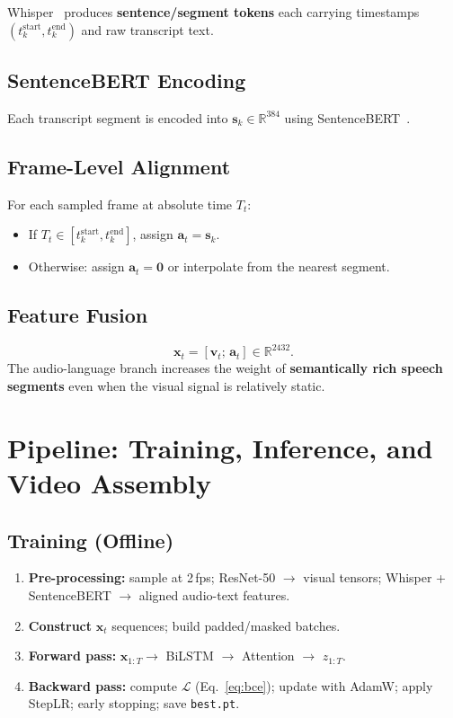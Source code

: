 \documentclass[10pt,conference]{IEEEtran}
\begin{document}
Whisper~\cite{radford2023whisper} produces \textbf{sentence/segment tokens}
each carrying timestamps $(t_k^{\mathrm{start}}, t_k^{\mathrm{end}})$ and raw
transcript text.

\subsection{SentenceBERT Encoding}

Each transcript segment is encoded into
$\mathbf{s}_k \in \mathbb{R}^{384}$ using SentenceBERT~\cite{reimers2019}.

\subsection{Frame-Level Alignment}

For each sampled frame at absolute time $T_t$:
\begin{itemize}
  \item If $T_t \in [t_k^{\mathrm{start}}, t_k^{\mathrm{end}}]$, assign
        $\mathbf{a}_t = \mathbf{s}_k$.
  \item Otherwise: assign $\mathbf{a}_t = \mathbf{0}$ or interpolate from
        the nearest segment.
\end{itemize}

\subsection{Feature Fusion}

\begin{equation}
  \mathbf{x}_t = [\mathbf{v}_t;\, \mathbf{a}_t] \in \mathbb{R}^{2432}.
\end{equation}
The audio-language branch increases the weight of \textbf{semantically rich
speech segments} even when the visual signal is relatively static.

\section{Pipeline: Training, Inference, and Video Assembly}

\subsection{Training (Offline)}

\begin{enumerate}
  \item \textbf{Pre-processing:} sample at 2\,fps; ResNet-50 $\to$ visual
        tensors; Whisper + SentenceBERT $\to$ aligned audio-text features.
  \item \textbf{Construct} $\mathbf{x}_t$ sequences; build padded/masked
        batches.
  \item \textbf{Forward pass:} $\mathbf{x}_{1:T} \to$ BiLSTM $\to$ Attention
        $\to$ $z_{1:T}$.
  \item \textbf{Backward pass:} compute $\mathcal{L}$ (Eq.~\ref{eq:bce});
        update with AdamW; apply StepLR; early stopping; save
        \texttt{best.pt}.
\end{enumerate}
\end{document}
